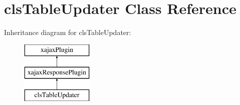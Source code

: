 \hypertarget{classclsTableUpdater}{
\section{clsTableUpdater Class Reference}
\label{classclsTableUpdater}
}
Inheritance diagram for clsTableUpdater:\begin{figure}[H]
\begin{center}
\leavevmode
\includegraphics[height=3.000000cm]{classclsTableUpdater}
\end{center}
\end{figure}
